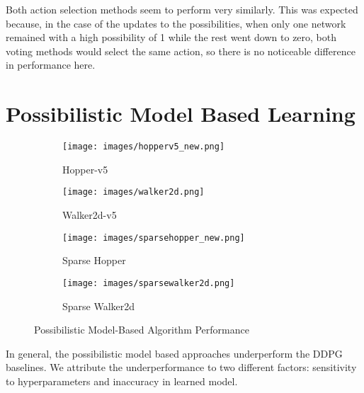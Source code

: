 \documentclass[11pt,a4paper]{report}
\begin{document}
\par Both action selection methods seem to perform very similarly. This was expected because, in the case of the updates to the possibilities, when only one network remained with a high possibility of 1 while the rest went down to zero, both voting methods would select the same action, so there is no noticeable difference in performance here.

\section{Possibilistic Model Based Learning}
\begin{figure}[ht]
  \centering
  \begin{subfigure}[b]{0.24\textwidth}
    \texttt{[image: images/hopperv5\_new.png]}
    \caption{Hopper-v5}
  \end{subfigure}
  \hfill
  \begin{subfigure}[b]{0.24\textwidth}
    \texttt{[image: images/walker2d.png]}
    \caption{Walker2d-v5}
  \end{subfigure}
  \hfill
  \begin{subfigure}[b]{0.24\textwidth}
    \texttt{[image: images/sparsehopper\_new.png]}
    \caption{Sparse Hopper}
  \end{subfigure}
  \hfill
  \begin{subfigure}[b]{0.24\textwidth}
    \texttt{[image: images/sparsewalker2d.png]}
    \caption{Sparse Walker2d}
  \end{subfigure}

  \caption{Possibilistic Model-Based Algorithm Performance} 
  \label{fig:modelbased}
\end{figure}


\par

In general, the possibilistic model based approaches underperform the DDPG baselines. We attribute the underperformance to two different factors: sensitivity to hyperparameters and inaccuracy in learned model. 
\end{document}
